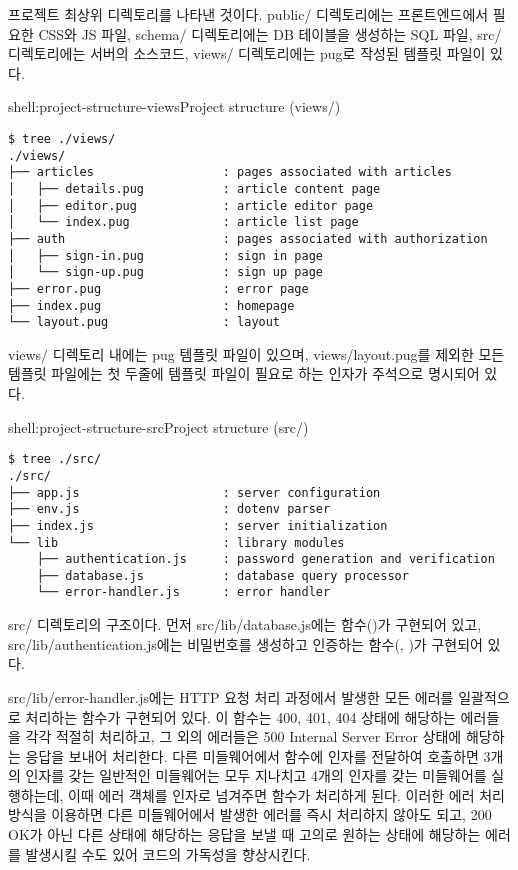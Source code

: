 \는 프로젝트 최상위 디렉토리를 나타낸 것이다. public/ 디렉토리에는 프론트엔드에서 필요한 CSS와 JS 파일, schema/ 디렉토리에는 DB 테이블을 생성하는 SQL 파일, src/ 디렉토리에는 서버의 소스코드, views/ 디렉토리에는 pug로 작성된 템플릿 파일이 있다.

\begin{shell}{shell:project-structure-views}{Project structure (views/)}
\begin{verbatim}
$ tree ./views/
./views/
├── articles                  : pages associated with articles
│   ├── details.pug           : article content page
│   ├── editor.pug            : article editor page
│   └── index.pug             : article list page
├── auth                      : pages associated with authorization
│   ├── sign-in.pug           : sign in page
│   └── sign-up.pug           : sign up page
├── error.pug                 : error page
├── index.pug                 : homepage
└── layout.pug                : layout
\end{verbatim}
\end{shell}

views/ 디렉토리 내에는 pug 템플릿 파일이 있으며, views/layout.pug를 제외한 모든 템플릿 파일에는 첫 두줄에 템플릿 파일이 필요로 하는 인자가 주석으로 명시되어 있다.

\begin{shell}{shell:project-structure-src}{Project structure (src/)}
\begin{verbatim}
$ tree ./src/
./src/
├── app.js                    : server configuration
├── env.js                    : dotenv parser
├── index.js                  : server initialization
└── lib                       : library modules
    ├── authentication.js     : password generation and verification
    ├── database.js           : database query processor
    └── error-handler.js      : error handler
\end{verbatim}
\end{shell}

\는 src/ 디렉토리의 구조이다. 먼저 src/lib/database.js에는  함수()가 구현되어 있고, src/lib/authentication.js에는 비밀번호를 생성하고 인증하는 함수(, )가 구현되어 있다.

src/lib/error-handler.js에는 HTTP 요청 처리 과정에서 발생한 모든 에러를 일괄적으로 처리하는  함수가 구현되어 있다. 이 함수는 400, 401, 404 상태에 해당하는 에러들을 각각 적절히 처리하고, 그 외의 에러들은 500 Internal Server Error 상태에 해당하는 응답을 보내어 처리한다. 다른 미들웨어에서  함수에 인자를 전달하여 호출하면 3개의 인자를 갖는 일반적인 미들웨어는 모두 지나치고 4개의 인자를 갖는 미들웨어를 실행하는데, 이때 에러 객체를 인자로 넘겨주면  함수가 처리하게 된다. 이러한 에러 처리 방식을 이용하면 다른 미들웨어에서 발생한 에러를 즉시 처리하지 않아도 되고, 200 OK가 아닌 다른 상태에 해당하는 응답을 보낼 때 고의로 원하는 상태에 해당하는 에러를 발생시킬 수도 있어 코드의 가독성을 향상시킨다.

